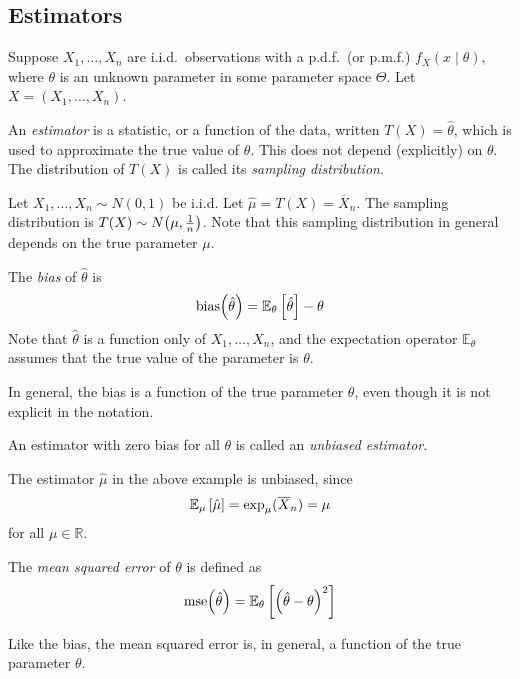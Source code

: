 \subsection{Estimators}
Suppose \( X_1, \dots, X_n \) are i.i.d.\ observations with a p.d.f.\ (or p.m.f.) \( f_X(x \mid \theta) \), where \( \theta \) is an unknown parameter in some parameter space \( \Theta \).
Let \( X = (X_1, \dots, X_n) \).
\begin{definition}
	An \textit{estimator} is a statistic, or a function of the data, written \( T(X) = \hat\theta \), which is used to approximate the true value of \( \theta \).
	This does not depend (explicitly) on \( \theta \).
	The distribution of \( T(X) \) is called its \textit{sampling distribution}.
\end{definition}
\begin{example}
	Let \( X_1, \dots, X_n \sim N(0,1) \) be i.i.d.
	Let \( \hat \mu = T(X) = \overline X_n \).
	The sampling distribution is \( T(X) \sim N\qty(\mu, \frac{1}{n}) \).
	Note that this sampling distribution in general depends on the true parameter \( \mu \).
\end{example}
\begin{definition}
	The \textit{bias} of \( \hat \theta \) is
	\[ \mathrm{bias}\qty(\hat \theta) = \mathbb{E}_{\theta}\left[{\hat \theta}\right] - \theta \]
	Note that \( \hat \theta \) is a function only of \( X_1, \dots, X_n \), and the expectation operator \( \mathbb E_\theta \) assumes that the true value of the parameter is \( \theta \).
\end{definition}
\begin{remark}
	In general, the bias is a function of the true parameter \( \theta \), even though it is not explicit in the notation.
\end{remark}
\begin{definition}
	An estimator with zero bias for all \( \theta \) is called an \textit{unbiased estimator}.
\end{definition}
\begin{example}
	The estimator \( \hat \mu \) in the above example is unbiased, since
	\[ \mathbb{E}_{\mu}\left[{\hat \mu}\right] = \exp_\mu(\overline X_n) = \mu \]
	for all \( \mu \in \mathbb R \).
\end{example}
\begin{definition}
	The \textit{mean squared error} of \( \theta \) is defined as
	\[ \mathrm{mse}\qty(\hat \theta) = \mathbb{E}_{\theta}\left[{\qty(\hat \theta - \theta)^2}\right] \]
\end{definition}
\begin{remark}
	Like the bias, the mean squared error is, in general, a function of the true parameter \( \theta \).
\end{remark}

